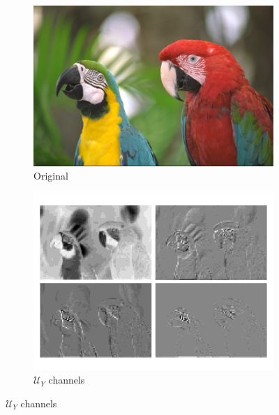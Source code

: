 \begin{figure}[!t]
    \centering
    \begin{minipage}{0.22\textwidth}
        \centering
        \begin{subfigure}{\textwidth}
            \centering
            \includegraphics[width=.80\textwidth]{figures/kodim23.pdf}
            \caption{Original}
        \end{subfigure}
    \end{minipage}%
    \begin{minipage}{0.40\textwidth}
        \centering
        \begin{subfigure}{\textwidth}
            \centering
            \includegraphics[width=.95\textwidth]{figures/kodim23_Y_components.pdf}
            \vspace{-10pt}
            \caption{$\bm{\mathcal{U}}_Y$ channels}
        \end{subfigure}
    \end{minipage}%
    \begin{minipage}{0.32\textwidth}

\end{minipage}
\end{figure}
